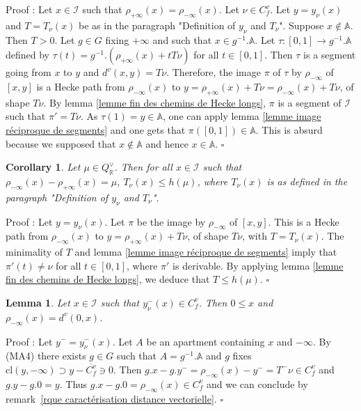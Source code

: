 \documentclass[12pt]{article}
\theoremstyle{plain}
\newtheorem{cor}[thm]{Corollary}
\newtheorem{lemme}[thm]{Lemma}
\theoremstyle{definition}
\newcommand{\R}{\mathbb{R}}
\newcommand{\A}{\mathbb{A}}
\newcommand{\I}{\mathcal{I}}
\begin{document}
Proof :  Let $x\in\mathcal{I}$ such that $\rho_{+\infty}(x)=\rho_{-\infty}(x)$. Let $\nu\in C_f^v$. Let $y=y_\nu(x)$ and $T=T_\nu(x)$ be as in the paragraph "Definition of $y_\nu$ and $T_\nu$". Suppose $x\notin \mathbb{A}$. Then $T>0$. Let $g\in G$ fixing $+\infty$ and such that $x\in g^{-1}.\A$. Let $\tau:[0,1]\rightarrow g^{-1}.\A$ defined by $\tau(t)=g^{-1}.(\rho_{+\infty}(x)+tT\nu)$ for all $t\in [0,1]$. Then $\tau$ is a segment going from $x$ to $y$ and $d^v(x,y)=T\nu$. Therefore, the image $\pi$ of $\tau$ by $\rho_{-\infty}$ of $[x,y]$ is a Hecke path from $\rho_{-\infty}(x)$ to $y=\rho_{+\infty}(x)+T\nu=\rho_{-\infty}(x)+T\nu$, of shape $T\nu$. By lemma \ref{lemme fin des chemins de Hecke longs}, $\pi$ is a segment of $\mathcal{I}$ such that $\pi'=T\nu$. As $\tau(1)=y\in \A$, one can apply lemma \ref{lemme image réciproque de segments} and one gets that $\pi([0,1])\in \mathbb{A}$. This is absurd because we supposed that $x\notin \mathbb{ A}$ and hence $x\in \mathbb{A}$. $\square$

\begin{cor}\label{corollaire majoration de T}
Let $\mu\in Q^\vee_\R$. Then for all $x\in \I$ such that $\rho_{-\infty}(x)-\rho_{+\infty}(x)=\mu$, $T_\nu(x)\leq h(\mu)$, where $T_\nu(x)$ is as defined in the paragraph "Definition of $y_\nu$ and $T_\nu$".
\end{cor}

Proof : Let $y=y_\nu(x)$. Let $\pi$ be the image by $\rho_{-\infty}$ of $[x,y]$. This is a Hecke path from $\rho_{-\infty}(x)$ to $y=\rho_{+\infty}(x)+T\nu$, of shape $T\nu$, with $T=T_\nu(x)$. The minimality of $T$ and lemma \ref{lemme image réciproque de segments} imply that $\pi'(t)\neq \nu$ for all $t\in [0,1]$, where $\pi'$ is derivable. By applying lemma \ref{lemme fin des chemins de Hecke longs}, we deduce that $T\leq h(\mu)$. $\square$




\begin{lemme}\label{lemme_rétraction et distance vectorielle}
Let $x\in \mathcal{I}$ such that $y_\nu^-(x)\in C^v_f$. Then $0\leq x$ and $\rho_{-\infty}(x)=d^v(0,x)$.
\end{lemme}

Proof : Let $y^-=y^-_\nu(x)$. Let $A$ be an apartment containing $x$ and $-\infty$. By (MA4) there exists $g\in G$ such that $A=g^{-1}.\A$ and $g$ fixes $\mathrm{cl}(y,-\infty)\supset y-\overline{C_f^v}\ni 0$. Then $g.x-g.y^-=\rho_{-\infty}(x)-y^-=T^-\nu\in C_f^v$ and $g.y-g.0=y$. Thus $g.x-g.0=\rho_{-\infty}(x)\in C_f^v$ and we can conclude by remark~\ref{rque caractérisation distance vectorielle}. $\square$
\end{document}
